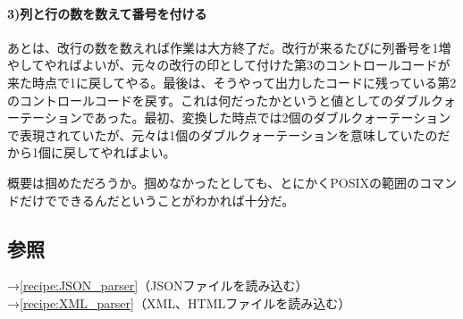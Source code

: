 \paragraph{3)列と行の数を数えて番号を付ける}
あとは、改行の数を数えれば作業は大方終了だ。改行が来るたびに列番号を1増やしてやればよいが、元々の改行の印として付けた第3のコントロールコードが来た時点で1に戻してやる。最後は、そうやって出力したコードに残っている第2のコントロールコードを戻す。これは何だったかというと値としてのダブルクォーテーションであった。最初、変換した時点では2個のダブルクォーテーションで表現されていたが、元々は1個のダブルクォーテーションを意味していたのだから1個に戻してやればよい。

概要は掴めただろうか。掴めなかったとしても、とにかくPOSIXの範囲のコマンドだけでできるんだということがわかれば十分だ。


\subsection*{参照}

\noindent
→\ref{recipe:JSON_parser}（JSONファイルを読み込む） \\
→\ref{recipe:XML_parser}（XML、HTMLファイルを読み込む）
